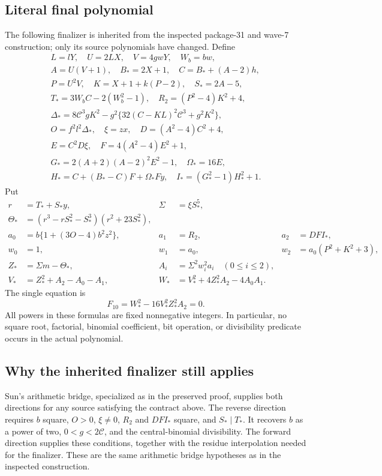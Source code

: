 \subsection{Literal final polynomial}

The following finalizer is inherited from the inspected package-31 and
wave-7 construction; only its source polynomials have changed.  Define
\begin{gather*}
 L=lY,\quad U=2LX,\quad V=4gwY,\quad W_b=bw,\\
 A=U(V+1),\quad B_*=2X+1,\quad C=B_*+(A-2)h,\\
 P=U^2V,\quad K=X+1+k(P-2),\quad S_*=2A-5,\\
 T_*=3W_bC-2(W_b^2-1),\quad R_2=(P^2-4)K^2+4,\\
 \Delta_*=8\mathcal C^3gK^2-g^2\{32(C-KL)^2\mathcal C^3+g^2K^2\},\\
 O=f^2l^2\Delta_*,\quad\xi=zx,\quad D=(A^2-4)C^2+4,\\
 E=C^2D\xi,\quad F=4(A^2-4)E^2+1,\\
 G_*=2(A+2)(A-2)^2E^2-1,\quad\Omega_*=16E,\\
 H_*=C+(B_*-C)F+\Omega_*Fy,\quad I_*=(G_*^2-1)H_*^2+1.
\end{gather*}
Put
\begin{align*}
 r&=T_*+S_*y,&\Sigma&=\xi S_*^5,\\
 \Theta_*&=(r^3-rS_*^2-S_*^3)(r^2+23S_*^2),\\
 a_0&=b\{1+(3O-4)b^2z^2\},&a_1&=R_2,&a_2&=DFI_*,\\
 w_0&=1,&w_1&=a_0,&w_2&=a_0(P^2+K^2+3),\\
 Z_*&=\Sigma m-\Theta_*,&A_i&=\Sigma^2w_i^2a_i\quad(0\le i\le2),\\
 V_*&=Z_*^2+A_2-A_0-A_1,&
 W_*&=V_*^2+4Z_*^2A_2-4A_0A_1.
\end{align*}
The single equation is
\begin{equation}
 \boxed{F_{10}=W_*^2-16V_*^2Z_*^2A_2=0.}
 \label{eq:ten-final}
\end{equation}
All powers in these formulas are fixed nonnegative integers.  In
particular, no square root, factorial, binomial coefficient, bit operation,
or divisibility predicate occurs in the actual polynomial.

\subsection{Why the inherited finalizer still applies}

Sun's arithmetic bridge, specialized as in the preserved proof, supplies
both directions for any source satisfying the contract above.  The reverse
direction requires \(b\) square, \(O>0\), \(\xi\ne0\),
\(R_2\) and \(DFI_*\) square, and \(S_*\mid T_*\).  It recovers
\(b\) as a power of two, \(0<g<2\mathcal C\), and the central-binomial
divisibility.  The forward direction supplies these conditions, together
with the residue interpolation needed for the finalizer.  These are the
same arithmetic bridge hypotheses as in the inspected construction.

